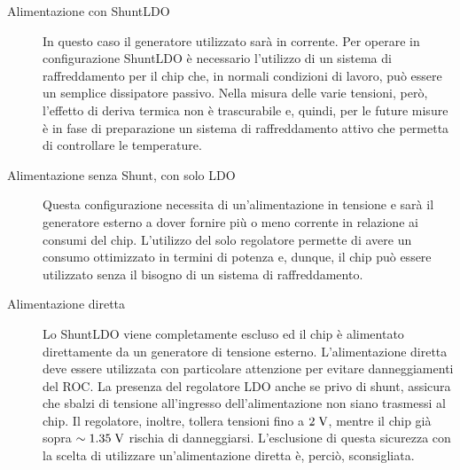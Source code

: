 \begin{description}
\item[Alimentazione con ShuntLDO] In questo caso il generatore utilizzato sarà in corrente. Per operare in configurazione ShuntLDO è necessario l'utilizzo di un sistema di raffreddamento per il chip che, in normali condizioni di lavoro, può essere un semplice dissipatore passivo. Nella misura delle varie tensioni, però, l'effetto di deriva termica non è trascurabile e, quindi, per le future misure \`e in fase di preparazione un sistema di raffreddamento attivo che permetta di controllare le temperature.

\item[Alimentazione senza Shunt, con solo LDO] Questa configurazione necessita di un'alimentazione in tensione e sarà il generatore esterno a dover fornire più o meno corrente in relazione ai consumi del chip. L'utilizzo del solo regolatore permette di avere un consumo ottimizzato in termini di potenza e, dunque, il chip pu\`o essere utilizzato senza il bisogno di un sistema di raffreddamento.

\item[Alimentazione diretta] Lo ShuntLDO viene completamente escluso ed il chip è alimentato direttamente da un generatore di tensione esterno. L'alimentazione diretta deve essere utilizzata con particolare attenzione per evitare danneggiamenti del ROC. La presenza del regolatore LDO anche se privo di shunt, assicura che sbalzi di tensione all'ingresso dell'alimentazione non siano trasmessi al chip. Il regolatore, inoltre, tollera tensioni fino a $2 \rm \; V$, mentre il chip già sopra $\sim 1.35\rm \; V$ rischia di danneggiarsi. L'esclusione di questa sicurezza con la scelta di utilizzare un'alimentazione diretta è, perciò, sconsigliata. 
\end{description}

